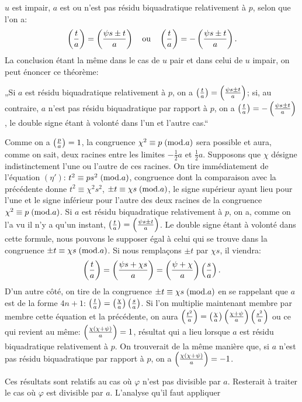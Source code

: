 \noindent
$u$ est impair, $a$ est ou n'est pas résidu biquadratique relativement à $p$, selon
que l'on a:
\[
\left(\frac{t}{a}\right)=\left(\frac{\psi s\pm t}{a}\right)\quad\text{ou}\quad
\left(\frac{t}{a}\right)=-\left(\frac{\psi s\pm t}{a}\right).
\]
La conclusion étant la même dans le cas de $u$ pair et dans celui de $u$ impair,
on peut énoncer ce théorème:
\par\indent
„Si $a$ est résidu biquadratique relativement à $p$, on a $\left(\frac{t}{a}\right)=\left(\frac{\psi s\pm t}{a}\right)$;
si, au contraire, $a$ n'est pas résidu biquadratique par rapport à $p$, on a
$\left(\frac{t}{a}\right)=-\left(\frac{\psi s\pm t}{a}\right)$, le double signe étant à volonté dans l'un et l'autre cas.“
\par\indent
Comme on a $\left(\frac{p}{a}\right)=1$, la congruence $\chi^2\equiv p\;(\mathrm{mod}.a)$ sera possible et
aura, comme on sait, deux racines entre les limites $-\frac12a$ et $\frac12a$. Supposons
que $\chi$ désigne indistinctement l'une ou l'autre de ces racines. On tire immédiatement
de l'équation $(\eta')$: $t^2\equiv ps^2\;(\mathrm{mod}.a)$, congruence dont la comparaison
avec la précédente donne $t^2\equiv\chi^2s^2$, $\pm t\equiv\chi s\;(\mathrm{mod}.a)$, le signe supérieur ayant
lieu pour l'une et le signe inférieur pour l'autre des deux racines de la congruence
$\chi^2\equiv p\;(\mathrm{mod}.a)$. Si $a$ est résidu biquadratique relativement à $p$, on
a, comme on l'a vu il n'y a qu'un instant, $\left(\frac{t}{a}\right)=\left(\frac{\psi s\pm t}{a}\right)$. Le double signe
étant à volonté dans cette formule, nous pouvons le supposer égal à celui qui
se trouve dans la congruence $\pm t\equiv\chi s\;(\mathrm{mod}.a)$. Si nous remplaçons $\pm t$ par
$\chi s$, il viendra:
\[
\left(\frac{t}{a}\right)=\left(\frac{\psi s+\chi s}{a}\right)=\left(\frac{\psi+\chi}{a}\right)\left(\frac{s}{a}\right).
\]
D'un autre côté, on tire de la congruence $\pm t\equiv\chi s\;(\mathrm{mod}.a)$ en se rappelant
que $a$ est de la forme $4n+1$: $\left(\frac{t}{a}\right)=\left(\frac{\chi}{a}\right)\left(\frac{s}{a}\right)$. Si l'on multiplie maintenant
membre par membre cette équation et la précédente, on aura $\left(\frac{t^2}{a}\right)=\left(\frac{\chi}{a}\right)\left(\frac{\chi+\psi}{a}\right)\left(\frac{s^2}{a}\right)$
ou ce qui revient au même: $\left(\frac{\chi(\chi+\psi)}{a}\right)=1$, résultat qui a lieu lorsque $a$ est
résidu biquadratique relativement à $p$. On trouverait de la même manière
que, si $a$ n'est pas résidu biquadratique par rapport à $p$, on a $\left(\frac{\chi(\chi+\psi)}{a}\right)=-1$.
\par\indent
Ces résultats sont relatifs au cas où $\varphi$ n'est pas divisible par $a$. Resterait
à traiter le cas où $\varphi$ est divisible par $a$. L'analyse qu'il faut appliquer
